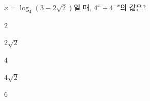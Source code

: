 $x=\log_4 (3-2\sqrt{2})$일 때, $4^x+4^{-x}$의 값은?
\begin{choices32}{\rule[-3ex]{0pt}{8ex}$2$}{\rule[-3ex]{0pt}{8ex}$2\sqrt{2}$}{\rule[-3ex]{0pt}{8ex}$4$}{\rule[-3ex]{0pt}{8ex}$4\sqrt{2}$}{\rule[-3ex]{0pt}{8ex}$6$}\end{choices32}
